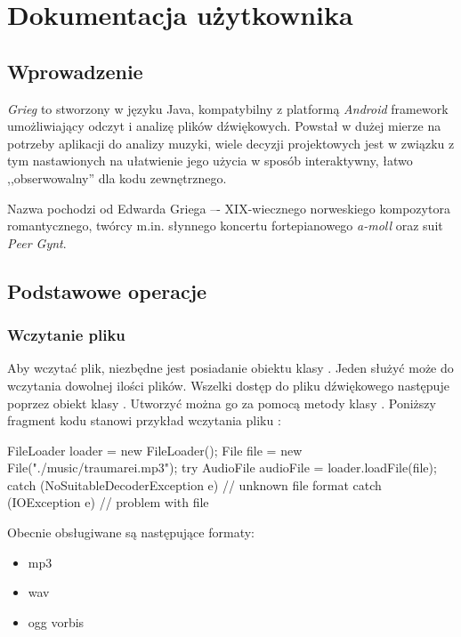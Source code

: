 
\chapter{Dokumentacja użytkownika}

\section{Wprowadzenie}

\emph{Grieg} to stworzony w języku Java, kompatybilny z platformą \textit{Android} framework
umożliwiający odczyt i analizę plików dźwiękowych. Powstał w dużej mierze na potrzeby aplikacji do
analizy muzyki, wiele decyzji projektowych jest w związku z tym nastawionych na ułatwienie jego
użycia w sposób interaktywny, łatwo ,,obserwowalny'' dla kodu zewnętrznego.

Nazwa pochodzi od Edwarda Griega –- XIX-wiecznego norweskiego kompozytora romantycznego, twórcy
m.in.  słynnego koncertu fortepianowego \textit{a-moll} oraz suit \textit{Peer Gynt}.

\section{Podstawowe operacje}

\subsection{Wczytanie pliku}

Aby wczytać plik, niezbędne jest posiadanie obiektu klasy . Jeden 
służyć może do wczytania dowolnej ilości plików. Wszelki dostęp do pliku dźwiękowego następuje
poprzez obiekt klasy . Utworzyć można go za pomocą metody 
klasy .  Poniższy fragment kodu stanowi przykład wczytania pliku
:

\begin{java}
FileLoader loader = new FileLoader();
File file = new File("./music/traumarei.mp3");
try {
    AudioFile audioFile = loader.loadFile(file);
} catch (NoSuitableDecoderException e) {
    // unknown file format
} catch (IOException e) {
    // problem with file
}
\end{java}

Obecnie obsługiwane są następujące formaty:

\begin{itemize}
  \item mp3
  \item wav
  \item ogg vorbis
\end{itemize}

